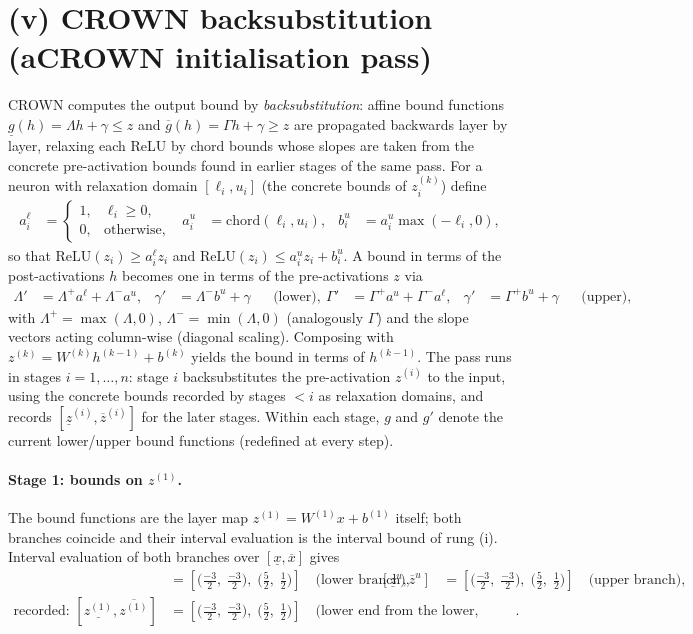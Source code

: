 \documentclass[11pt]{article}
\begin{document}
\section{(v) CROWN backsubstitution (aCROWN initialisation pass)}
CROWN computes the output bound by \emph{backsubstitution}: affine bound functions
$\underline{g}(h) = \Lambda h + \gamma \le z$ and $\overline{g}(h) = \Gamma h + \gamma \ge z$
are propagated backwards layer by layer, relaxing each ReLU by chord bounds whose slopes are taken
from the concrete pre-activation bounds found in earlier stages of the same pass. For a neuron with
relaxation domain $[\ell_i, u_i]$ (the concrete bounds of $z^{(k)}_i$) define
\begin{align*}
a^{\ell}_i &= \begin{cases} 1, & \ell_i \ge 0,\\ 0, & \text{otherwise}, \end{cases} & a^{u}_i &= \mathrm{chord}(\ell_i, u_i), & b^{u}_i &= a^{u}_i \max(-\ell_i, 0),
\end{align*}
so that $\mathrm{ReLU}(z_i) \ge a^{\ell}_i z_i$ and
$\mathrm{ReLU}(z_i) \le a^{u}_i z_i + b^{u}_i$. A bound in terms of the post-activations $h$ becomes
one in terms of the pre-activations $z$ via
\begin{align*}
\Lambda' &= \Lambda^{+} a^{\ell} + \Lambda^{-} a^{u}, & \gamma' &= \Lambda^{-} b^{u} + \gamma && \text{(lower)}, \
\Gamma' &= \Gamma^{+} a^{u} + \Gamma^{-} a^{\ell}, & \gamma' &= \Gamma^{+} b^{u} + \gamma && \text{(upper)},
\end{align*}
with $\Lambda^{+} = \max(\Lambda, 0)$, $\Lambda^{-} = \min(\Lambda, 0)$ (analogously $\Gamma$) and the
slope vectors acting column-wise (diagonal scaling). Composing with
$z^{(k)} = W^{(k)} h^{(k-1)} + b^{(k)}$ yields the bound in terms of $h^{(k-1)}$. The pass runs in
stages $i = 1, \dots, n$: stage $i$ backsubstitutes the pre-activation $z^{(i)}$ to the input, using
the concrete bounds recorded by stages $< i$ as relaxation domains, and records
$[\underline{z}^{(i)}, \overline{z}^{(i)}]$ for the later stages. Within each stage, $g$ and $g'$
denote the current lower/upper bound functions (redefined at every step).
\paragraph{Stage 1: bounds on $z^{(1)}$.}
The bound functions are the layer map $z^{(1)} = W^{(1)} x + b^{(1)}$ itself; both branches coincide and their interval evaluation is the interval bound of rung (i).
Interval evaluation of both branches over $[\underline{x}, \overline{x}]$ gives
\begin{align*}
[\underline{z}^{\ell}, \overline{z}^{\ell}] &= [\bigl(\frac{-3}{2},\; \frac{-3}{2}\bigr),\; \bigl(\frac{5}{2},\; \frac{1}{2}\bigr)] \quad\text{(lower branch)}, & [\underline{z}^{u}, \overline{z}^{u}] &= [\bigl(\frac{-3}{2},\; \frac{-3}{2}\bigr),\; \bigl(\frac{5}{2},\; \frac{1}{2}\bigr)] \quad\text{(upper branch)}, \\
\text{recorded: } [\underline{z^{(1)}}, \overline{z^{(1)}}] &= [\bigl(\frac{-3}{2},\; \frac{-3}{2}\bigr),\; \bigl(\frac{5}{2},\; \frac{1}{2}\bigr)] \quad\text{(lower end from the lower, upper end from the upper branch)}.
\end{align*}
\end{document}
